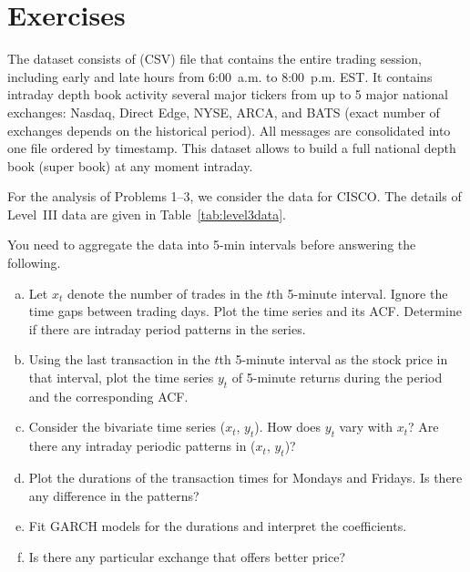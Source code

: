 \section{Exercises}

The dataset consists of (CSV) file that contains the entire trading session, including early and late hours from 6:00~a.m. to 8:00~p.m. EST. It contains intraday depth book activity several major tickers from up to 5 major national exchanges: Nasdaq, Direct Edge, NYSE, ARCA, and BATS (exact number of exchanges depends on the historical period). All messages are consolidated into one file ordered by timestamp. This dataset allows to build a full national depth book (super book) at any moment intraday. 


For the analysis of Problems 1--3, we consider the data for CISCO. The details of Level~III data are given in Table~\ref{tab:level3data}. \twomedskip


\prob You need to aggregate the data into 5-min intervals before answering the following.
        \begin{enumerate}[(a)]
        \item Let $x_t$ denote the number of trades in the $t$th 5-minute interval. Ignore the time gaps between trading days. Plot the time series and its ACF. Determine if there are intraday period patterns in the series.
        \item Using the last transaction in the $t$th 5-minute interval as the stock price in that interval, plot the time series $y_t$ of 5-minute returns during the period and the corresponding ACF.
        \item Consider the bivariate time series ($x_t$, $y_t$). How does $y_t$ vary with $x_t$? Are there any intraday periodic patterns in ($x_t$, $y_t$)?
        \item Plot the durations of the transaction times for Mondays and Fridays. Is there any difference in the patterns?
        \item Fit GARCH models for the durations and interpret the coefficients.
        \item Is there any particular exchange that offers better price? \twomedskip
        \end{enumerate}



